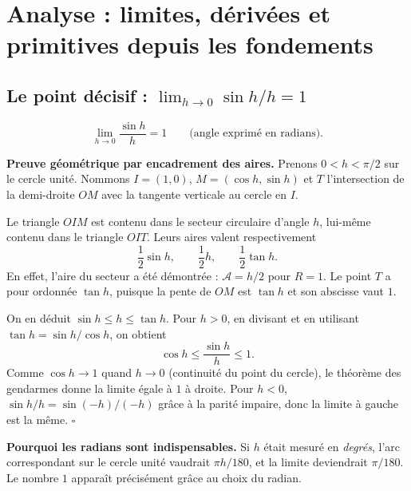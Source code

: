 \documentclass[../cours_spe_trigo.tex]{subfiles}
\begin{document}
\setcounter{chapter}{13}
\chapter{Analyse : limites, dérivées et primitives depuis les fondements}
\section{Le point décisif : $\lim_{h\to0}\sin h/h=1$}
\begin{propriete}
\[\boxed{\displaystyle\lim_{h\to0}\frac{\sin h}{h}=1}\qquad\text{(angle exprimé en radians).}\]
\end{propriete}
\begin{demonstration}
\textbf{Preuve géométrique par encadrement des aires.} Prenons $0<h<\pi/2$ sur le cercle unité. Nommons $I=(1,0)$, $M=(\cos h,\sin h)$ et $T$ l'intersection de la demi-droite $OM$ avec la tangente verticale au cercle en $I$.

Le triangle $OIM$ est contenu dans le secteur circulaire d'angle $h$, lui-même contenu dans le triangle $OIT$. Leurs aires valent respectivement
\[
\frac12\sin h,\qquad\frac12h,\qquad\frac12\tan h.
\]
En effet, l'aire du secteur a été démontrée : $\mathcal A=h/2$ pour $R=1$. Le point $T$ a pour ordonnée $\tan h$, puisque la pente de $OM$ est $\tan h$ et son abscisse vaut $1$.

On en déduit $\sin h\le h\le\tan h$. Pour $h>0$, en divisant et en utilisant $\tan h=\sin h/\cos h$, on obtient
\[
\cos h\le\frac{\sin h}{h}\le1.
\]
Comme $\cos h\to1$ quand $h\to0$ (continuité du point du cercle), le théorème des gendarmes donne la limite égale à $1$ à droite. Pour $h<0$, $\sin h/h=\sin(-h)/(-h)$ grâce à la parité impaire, donc la limite à gauche est la même. $\square$
\end{demonstration}
\begin{center}
\end{center}
\textbf{Pourquoi les radians sont indispensables.} Si $h$ était mesuré en \emph{degrés}, l'arc correspondant sur le cercle unité vaudrait $\pi h/180$, et la limite deviendrait $\pi/180$. Le nombre $1$ apparaît précisément grâce au choix du radian.
\end{document}
